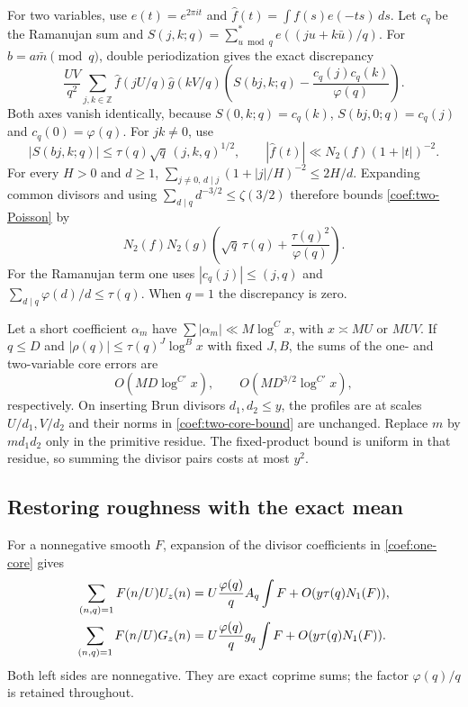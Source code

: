 For two variables, use $e(t)=e^{2\pi it}$ and
$\widehat f(t)=\int f(s)e(-ts)\,ds$.
Let $c_q$ be the Ramanujan sum and
$S(j,k;q)=\sum_{u\bmod q}^{*}e((ju+k\bar u)/q)$.
For $b=a\bar m\pmod q$, double periodization gives the exact
discrepancy
\begin{equation}
 \frac{UV}{q^2}\sum_{j,k\in\mathbb Z}
 \widehat f(jU/q)\widehat g(kV/q)
 \left(S(bj,k;q)-\frac{c_q(j)c_q(k)}{\varphi(q)}\right).
 \label{coef:two-Poisson}
\end{equation}
Both axes vanish identically, because
$S(0,k;q)=c_q(k)$, $S(bj,0;q)=c_q(j)$ and $c_q(0)=\varphi(q)$.
For $jk\ne0$, use
\[
 |S(bj,k;q)|\le\tau(q)\sqrt q\,(j,k,q)^{1/2},\qquad
 |\widehat f(t)|\ll N_2(f)(1+|t|)^{-2}.
\]
For every $H>0$ and $d\ge1$,
$\sum_{j\ne0,\,d\mid j}(1+|j|/H)^{-2}\le2H/d$.
Expanding common divisors and using
$\sum_{d\mid q}d^{-3/2}\le\zeta(3/2)$ therefore bounds
\eqref{coef:two-Poisson} by
\begin{equation}
 N_2(f)N_2(g)
 \left(\sqrt q\,\tau(q)+\frac{\tau(q)^2}{\varphi(q)}\right).
 \label{coef:two-core-bound}
\end{equation}
For the Ramanujan term one uses
$|c_q(j)|\le(j,q)$ and
$\sum_{d\mid q}\varphi(d)/d\le\tau(q)$.
When $q=1$ the discrepancy is zero.

Let a short coefficient $\alpha_m$ have
$\sum|\alpha_m|\ll M\log^C x$, with $x\asymp MU$ or $MUV$.
If $q\le D$ and $|\rho(q)|\le\tau(q)^J\log^B x$ with fixed $J,B$,
the sums of the one- and two-variable core errors are
\begin{equation}
 O(MD\log^{C'}x),\qquad O(MD^{3/2}\log^{C'}x),
 \label{coef:core-summed}
\end{equation}
respectively.  On inserting Brun divisors $d_1,d_2\le y$, the profiles
are at scales $U/d_1,V/d_2$ and their norms in
\eqref{coef:two-core-bound} are unchanged.  Replace $m$ by $md_1d_2$
only in the primitive residue.  The fixed-product bound is uniform in
that residue, so summing the divisor pairs costs at most $y^2$.

\subsection{Restoring roughness with the exact mean}

For a nonnegative smooth $F$, expansion of the divisor coefficients in
\eqref{coef:one-core} gives
\begin{align}
 \sum_{(n,q)=1}F(n/U)U_z(n)
 &=U\frac{\varphi(q)}q A_q\int F+O(y\tau(q)N_1(F)),\notag\\
 \sum_{(n,q)=1}F(n/U)G_z(n)
 &=U\frac{\varphi(q)}q g_q\int F+O(y\tau(q)N_1(F)).
 \label{coef:exact-Brun-means}
\end{align}
Both left sides are nonnegative.  They are exact coprime sums;
the factor $\varphi(q)/q$ is retained throughout.

